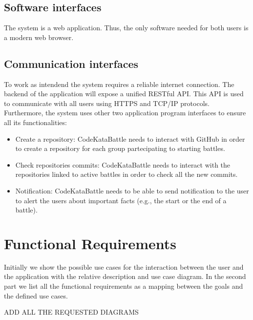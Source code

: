 \documentclass[12pt, a4paper]{report}
\begin{document}
        \subsection{Software interfaces}
        The system is a web application. 
        Thus, the only software needed for both users is a modern web browser. 

        \subsection{Communication interfaces}
        To work as intendend the system requires a reliable internet connection. 
        The backend of the application will expose a unified RESTful API. 
        This API is used to communicate with all users using HTTPS and TCP/IP protocols. \\
        Furthermore, the system uses other two application program interfaces to ensure all its functionalities: 
        \begin{itemize}
            \item Create a repository: CodeKataBattle needs to interact with GitHub in order to create a repository for each group partecipating to starting battles. 
            \item Check repositories commits: CodeKataBattle needs to interact with the repositories linked to active battles in order to check all the new commits. 
            \item Notification: CodeKataBattle needs to be able to send notification to the user to alert the users about important facts (e.g., the start or the end of a battle). 
        \end{itemize}

    \section{Functional Requirements}
        Initially we show the possible use cases for the interaction between the user and the application with the relative description and use case diagram. 
        In the second part we list all the functional requirements as a mapping between the goals and the defined use cases. 
        
        ADD ALL THE REQUESTED DIAGRAMS
\end{document}
